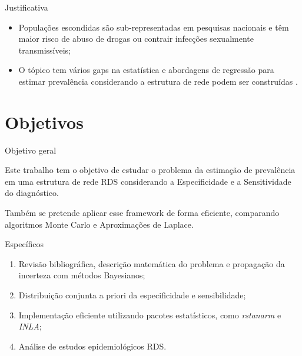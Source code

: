 \documentclass{beamer}
\newcommand{\Space}{\vspace{3ex}}
\begin{document}
\begin{frame}{Justificativa}
  \begin{itemize}

    \justifying

    \item Populações escondidas são sub-representadas em pesquisas nacionais e
    têm maior risco de abuso de drogas ou contrair infecções sexualmente
    transmissíveis;

    \Space
    
    \item O tópico tem vários gaps na estatística e abordagens de regressão
    para estimar prevalência considerando a estrutura de rede podem ser
    construídas \cite{bastos2012binary}.
  \end{itemize}
\end{frame}



\section{Objetivos}

\begin{frame}{Objetivo geral}

  \justifying

  Este trabalho tem o objetivo de estudar o problema da estimação de
  prevalência em uma estrutura de rede RDS considerando a Especificidade e a
  Sensitividade do diagnóstico. 

  \Space
  
  Também se pretende aplicar esse framework de
  forma eficiente, comparando algoritmos Monte Carlo e Aproximações de Laplace. 
\end{frame}

\begin{frame}{Específicos}

  \begin{enumerate}

    \justifying

    \item Revisão bibliográfica, descrição matemática do problema e propagação
    da incerteza com métodos Bayesianos; 

    \Space

    \item Distribuição conjunta a priori da especificidade e sensibilidade;
    
    \Space

    \item Implementação eficiente utilizando pacotes estatísticos, como {\em rstanarm} e {\em INLA};
    
    \Space

    \item Análise de estudos epidemiológicos RDS.
  \end{enumerate}
  
\end{frame}
\end{document}
